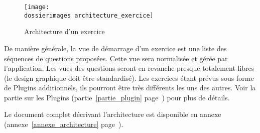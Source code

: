 \begin{figure}[htp]
	\centering
	\texttt{[image: \\dossierimages architecture\_exercice]}
	\caption{Architecture d'un exercice}
	\label{architecture_exercice}
\end{figure}

De manière générale, la vue de démarrage d’un exercice est une liste des séquences de questions proposées. Cette vue sera normalisée et gérée par l'application. Les vues des questions seront en revanche presque totalement libres (le design graphique doit être standardisé). Les exercices étant prévus sous forme de \og{}Plugins\fg{} additionnels, ils pourront \^{e}tre très différents les uns des autres. Voir la partie sur les Plugins (partie~\ref{partie_plugin} page~\pageref{partie_plugin}) pour plus de détails.

Le document complet décrivant l'architecture est disponible en annexe (annexe~\ref{annexe_architecture} page~\pageref{annexe_architecture}).
